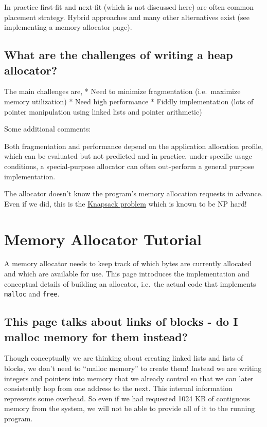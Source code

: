 In practice first-fit and next-fit (which is not discussed here) are
often common placement strategy. Hybrid approaches and many other
alternatives exist (see implementing a memory allocator page).

\subsection{What are the challenges of writing a heap
allocator?}\label{what-are-the-challenges-of-writing-a-heap-allocator}

The main challenges are, * Need to minimize fragmentation (i.e.~maximize
memory utilization) * Need high performance * Fiddly implementation
(lots of pointer manipulation using linked lists and pointer arithmetic)

Some additional comments:

Both fragmentation and performance depend on the application allocation
profile, which can be evaluated but not predicted and in practice,
under-specific usage conditions, a special-purpose allocator can often
out-perform a general purpose implementation.

The allocator doesn't know the program's memory allocation requests in
advance. Even if we did, this is the
\href{http://en.wikipedia.org/wiki/Knapsack_problem}{Knapsack problem}
which is known to be NP hard!

\section{Memory Allocator Tutorial}\label{memory-allocator-tutorial}

A memory allocator needs to keep track of which bytes are currently
allocated and which are available for use. This page introduces the
implementation and conceptual details of building an allocator, i.e.~the
actual code that implements \texttt{malloc} and \texttt{free}.

\subsection{This page talks about links of blocks - do I malloc memory
for them
instead?}\label{this-page-talks-about-links-of-blocks---do-i-malloc-memory-for-them-instead}

Though conceptually we are thinking about creating linked lists and
lists of blocks, we don't need to ``malloc memory'' to create them!
Instead we are writing integers and pointers into memory that we already
control so that we can later consistently hop from one address to the
next. This internal information represents some overhead. So even if we
had requested 1024 KB of contiguous memory from the system, we will not
be able to provide all of it to the running program.

